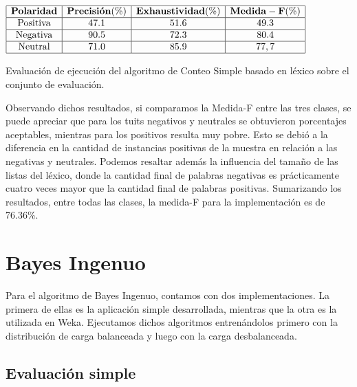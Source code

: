 \begin{table}[htb] 
\centering

$
\begin{array}{|c|c|c|c|}
      \hline
      \mathbf{Polaridad} & \mathbf{Precisi\acute{o}n(\%)} & \mathbf{Exhaustividad(\%)} & \mathbf{Medida-F(\%)}	\\
      \hline
      \mathrm{Positiva}  & 47.1	& 51.6 & 49.3	\\
      \hline
      \mathrm{Negativa}  & 90.5 & 72.3 & 80.4	\\
      \hline
      \mathrm{Neutral}	 & 71.0 & 85.9 & 77,7	\\
      \hline
\end{array}
$
\caption{Evaluaci\'on de ejecuci\'on del algoritmo de Conteo Simple basado en l\'exico sobre el conjunto de evaluaci\'on.}
\label{res:conteosimple}
\end{table}

Observando dichos resultados, si comparamos la Medida-F entre las tres clases, se puede apreciar que para los tuits negativos y neutrales se obtuvieron porcentajes aceptables, mientras para los positivos resulta muy pobre. Esto se debi\'o a la diferencia en la cantidad de instancias positivas de la muestra en relaci\'on a las negativas y neutrales. Podemos resaltar adem\'as la influencia del tama\~no de las listas del l\'exico, donde la cantidad final de palabras negativas es pr\'acticamente cuatro veces mayor que la cantidad final de palabras positivas. Sumarizando los resultados, entre todas las clases, la medida-F para la implementaci\'on es de 76.36\%.


\section{Bayes Ingenuo}

Para el algoritmo de Bayes Ingenuo, contamos con dos implementaciones. La primera de ellas es la aplicaci\'on simple desarrollada, mientras que la otra es la utilizada en Weka. Ejecutamos dichos algoritmos entren\'andolos primero con la distribuci\'on de carga balanceada y luego con la carga desbalanceada.
\newline

\subsection{Evaluaci\'on simple}

